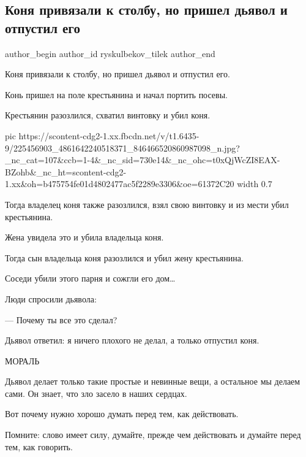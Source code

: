  
 
 
 
 
 
\subsection{Коня привязали к столбу, но пришел дьявол и отпустил его}
\label{sec:29_07_2021.fb.ryskulbekov_tilek.1.kon_djavol_slovo}
 
\ifcmt
 author_begin
   author_id ryskulbekov_tilek
 author_end
\fi

Коня привязали к столбу, но пришел дьявол и отпустил его.

Конь пришел на поле крестьянина и начал портить посевы.

Крестьянин разозлился, схватил винтовку и убил коня.

\ifcmt
  pic https://scontent-cdg2-1.xx.fbcdn.net/v/t1.6435-9/225456903_4861642240518371_846466520860987098_n.jpg?_nc_cat=107&ccb=1-4&_nc_sid=730e14&_nc_ohc=t0xQjWcZI8EAX-BZohb&_nc_ht=scontent-cdg2-1.xx&oh=b475754fe01d4802477ac5f2289e3306&oe=61372C20
  width 0.7
\fi

Тогда владелец коня также разозлился, взял свою винтовку и из мести убил
крестьянина.

Жена увидела это и убила владельца коня.

Тогда сын владельца коня разозлился и убил жену крестьянина.

Соседи убили этого парня и сожгли его дом…

Люди спросили дьявола:

— Почему ты все это сделал?

Дьявол ответил: я ничего плохого не делал, а только отпустил коня.

МОРАЛЬ

Дьявол делает только такие простые и невинные вещи, а остальное мы делаем сами.
Он знает, что зло засело в наших сердцах.

Вот почему нужно хорошо думать перед тем, как действовать.

Помните: слово имеет силу, думайте, прежде чем действовать и думайте перед тем,
как говорить.

